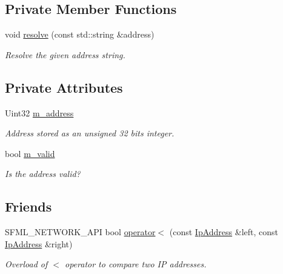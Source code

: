 \subsection*{Private Member Functions}
\begin{DoxyCompactItemize}
\item 
void \mbox{\hyperlink{classsf_1_1_ip_address_aa6e114d1a8cb977aff6132d490e4a6b1}{resolve}} (const std\+::string \&address)
\begin{DoxyCompactList}\small\item\em Resolve the given address string. \end{DoxyCompactList}\end{DoxyCompactItemize}
\subsection*{Private Attributes}
\begin{DoxyCompactItemize}
\item 
\mbox{\label{classsf_1_1_ip_address_ac8c48a38d66259b4f94f456664dc6511}} 
Uint32 \mbox{\hyperlink{classsf_1_1_ip_address_ac8c48a38d66259b4f94f456664dc6511}{m\+\_\+address}}
\begin{DoxyCompactList}\small\item\em Address stored as an unsigned 32 bits integer. \end{DoxyCompactList}\item 
\mbox{\label{classsf_1_1_ip_address_aa4640b45da3e619bad98ba3702f13395}} 
bool \mbox{\hyperlink{classsf_1_1_ip_address_aa4640b45da3e619bad98ba3702f13395}{m\+\_\+valid}}
\begin{DoxyCompactList}\small\item\em Is the address valid? \end{DoxyCompactList}\end{DoxyCompactItemize}
\subsection*{Friends}
\begin{DoxyCompactItemize}
\item 
S\+F\+M\+L\+\_\+\+N\+E\+T\+W\+O\+R\+K\+\_\+\+A\+PI bool \mbox{\hyperlink{classsf_1_1_ip_address_a1c4ae6b26e9df765ca57d2715e9a7885}{operator$<$}} (const \mbox{\hyperlink{classsf_1_1_ip_address}{Ip\+Address}} \&left, const \mbox{\hyperlink{classsf_1_1_ip_address}{Ip\+Address}} \&right)
\begin{DoxyCompactList}\small\item\em Overload of $<$ operator to compare two IP addresses. \end{DoxyCompactList}\end{DoxyCompactItemize}


